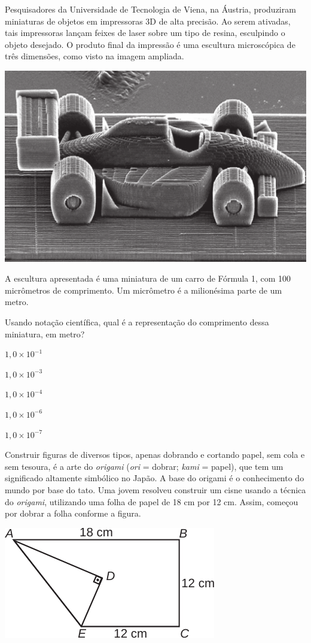 \questao
Pesquisadores da Universidade de Tecnologia
de Viena, na Áustria, produziram miniaturas de
objetos em impressoras 3D de alta precisão. Ao
serem ativadas, tais impressoras lançam feixes de
laser sobre um tipo de resina, esculpindo o objeto
desejado. O produto final da impressão é uma
escultura microscópica de três dimensões, como
visto na imagem ampliada.

\begin{center}
\includegraphics[width=.48\textwidth]{subareas/matematica/enem_2020-147-foto.pdf}
\end{center}

A escultura apresentada é uma miniatura de
um carro de Fórmula 1, com 100 micrômetros de
comprimento. Um micrômetro é a milionésima parte
de um metro.

Usando notação científica, qual é a representação do
comprimento dessa miniatura, em metro?

\begin{alternativas}
\item $1,0 \times 10^{-1}$
\item $1,0 \times 10^{-3}$
\item $1,0 \times 10^{-4}$
\item $1,0 \times 10^{-6}$
\item $1,0 \times 10^{-7}$
\end{alternativas}


\questao
Construir figuras de diversos tipos, apenas
dobrando e cortando papel, sem cola e sem tesoura, é
a arte do \textit{origami} (\textit{ori} = dobrar; \textit{kami} = papel), que tem
um significado altamente simbólico no Japão. A base
do origami é o conhecimento do mundo por base do
tato. Uma jovem resolveu construir um cisne usando
a técnica do \textit{origami}, utilizando uma folha de papel de
18 cm por 12 cm. Assim, começou por dobrar a folha
conforme a figura.

\begin{center}
\includegraphics[width=.35\textwidth]{subareas/matematica/enem_2019-171-desenho.pdf}
\end{center}

